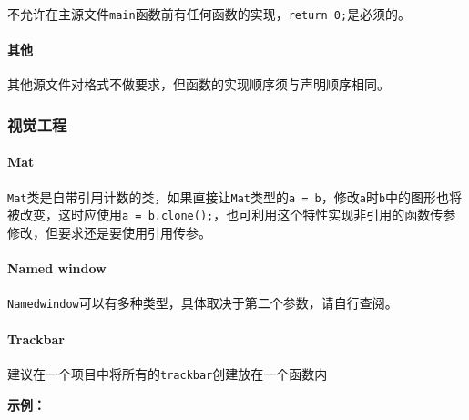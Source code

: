\documentclass[
]{article}
\begin{document}
不允许在主源文件\texttt{main}函数前有任何函数的实现，\texttt{return\ 0;}是必须的。

\hypertarget{ux5176ux4ed6}{%
\paragraph{其他}\label{ux5176ux4ed6}}

其他源文件对格式不做要求，但函数的实现顺序须与声明顺序相同。

\hypertarget{ux89c6ux89c9ux5de5ux7a0b}{%
\subsubsection{视觉工程}\label{ux89c6ux89c9ux5de5ux7a0b}}

\hypertarget{mat}{%
\paragraph{Mat}\label{mat}}

\texttt{Mat}类是自带引用计数的类，如果直接让\texttt{Mat}类型的\texttt{a\ =\ b}，修改\texttt{a}时\texttt{b}中的图形也将被改变，这时应使用\texttt{a\ =\ b.clone();}，也可利用这个特性实现非引用的函数传参修改，但要求还是要使用引用传参。

\hypertarget{named-window}{%
\paragraph{Named window}\label{named-window}}

\texttt{Namedwindow}可以有多种类型，具体取决于第二个参数，请自行查阅。

\hypertarget{trackbar}{%
\paragraph{Trackbar}\label{trackbar}}

建议在一个项目中将所有的\texttt{trackbar}创建放在一个函数内

\textbf{示例：}
\end{document}
